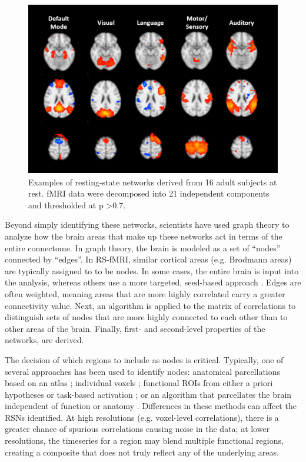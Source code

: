 \begin{figure}[t]
    \centering
    \includegraphics[height=3in]{images/ch1-ica.png}
    \caption[Examples of resting-state networks.]{Examples of resting-state networks derived from 16 adult subjects at rest. fMRI data were decomposed into 21 independent components and thresholded at p \textgreater 0.7.}
    \label{fig:ch1-ica}
\end{figure}

Beyond simply identifying these networks, scientists have used graph theory to analyze how the brain areas that make up these networks act in terms of the entire connectome. In graph theory, the brain is modeled as a set of ``nodes'' connected by ``edges''. In RS-fMRI, similar cortical areas (e.g. Brodmann areas) are typically assigned to to be nodes. In some cases, the entire brain is input into the analysis, whereas others use a more targeted, seed-based approach \citep{Vogel2010}.  Edges are often weighted, meaning areas that are more highly correlated carry a greater connectivity value. Next, an algorithm is applied to the matrix of correlations to distinguish sets of nodes that are more highly connected to each other than to other areas of the brain. Finally, first- and second-level properties of the networks, are derived.

The decision of which regions to include as nodes is critical. Typically, one of several approaches has been used to identify nodes: anatomical parcellations based on an atlas \citep{Supekar2008, Liu2008, Lynall2010}; individual voxels \citep{Fair2007}; functional ROIs from either a priori hypotheses or task-based activation \citep{VandenHeuvel2010}; or an algorithm that parcellates the brain independent of function or anatomy \citep{Goni2014}. Differences in these methods can affect the RSNs identified. At high resolutions (e.g. voxel-level correlations), there is a greater chance of spurious correlations causing noise in the data; at lower resolutions, the timeseries for a region may blend multiple functional regions, creating a composite that does not truly reflect any of the underlying areas. 

